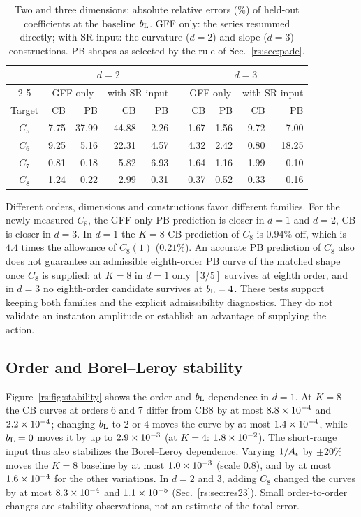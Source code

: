 \begin{table}[htbp]\centering\small
\begin{tabular}{@{}c rrrr c rrrr@{}}
\toprule
& \multicolumn{4}{c}{$d=2$} && \multicolumn{4}{c}{$d=3$}\\
\cmidrule{2-5}\cmidrule{7-10}
& \multicolumn{2}{c}{GFF only} & \multicolumn{2}{c}{with SR input} && \multicolumn{2}{c}{GFF only} & \multicolumn{2}{c}{with SR input}\\
Target & CB & PB & CB & PB && CB & PB & CB & PB\\ \midrule
$C_5$ & 7.75 & 37.99 & 44.88 & 2.26 && 1.67 & 1.56 & 9.72 & 7.00\\
$C_6$ & 9.25 & 5.16 & 22.31 & 4.57 && 4.32 & 2.42 & 0.80 & 18.25\\
$C_7$ & 0.81 & 0.18 & 5.82 & 6.93 && 1.64 & 1.16 & 1.99 & 0.10\\
$C_8$ & 1.24 & 0.22 & 2.99 & 0.31 && 0.37 & 0.52 & 0.33 & 0.16\\
\bottomrule
\end{tabular}
\caption{Two and three dimensions: absolute relative errors (\%) of held-out coefficients
at the baseline $b_{\mathrm L}$. GFF only: the series resummed directly; with SR input: the curvature
($d=2$) and slope ($d=3$) constructions. PB shapes as selected by the rule of
Sec.~\ref{rs:sec:pade}.}
\label{rs:tab:heldout23}
\end{table}

Different orders, dimensions and constructions favor different families. For the
newly measured $C_8$, the GFF-only PB prediction is closer in $d=1$ and $d=2$, CB is
closer in $d=3$. In $d=1$ the $K=8$ CB prediction of $C_8$ is $0.94\%$ off, which is $4.4$
times the allowance of $C_8(1)$ ($0.21\%$). An accurate PB prediction of $C_8$ also does not
guarantee an admissible eighth-order PB curve of the matched shape once $C_8$ is supplied: at
$K=8$ in $d=1$ only $[3/5]$ survives at eighth order, and in $d=3$ no eighth-order candidate
survives at $b_{\mathrm L}=4$. These tests support keeping both families and the
explicit admissibility diagnostics. They do not validate an instanton amplitude or establish
an advantage of supplying the action.

\subsection{Order and Borel--Leroy stability}
Figure~\ref{rs:fig:stability} shows the order and $b_{\mathrm L}$ dependence in $d=1$. At $K=8$ the CB
curves at orders 6 and 7 differ from CB8 by at most $8.8\times10^{-4}$ and $2.2\times10^{-4}$; changing
$b_{\mathrm L}$ to $2$ or $4$ moves the curve by at most $1.4\times10^{-4}$, while $b_{\mathrm L}=0$ moves it by up to
$2.9\times10^{-3}$ (at $K=4$: $1.8\times10^{-2}$). The short-range input thus also stabilizes the
Borel--Leroy dependence. Varying $1/A_\epsilon$ by $\pm20\%$ moves the $K=8$ baseline by at most
$1.0\times10^{-3}$ (scale $0.8$), and by at most $1.6\times10^{-4}$ for the other variations. In
$d=2$ and $3$, adding $C_8$ changed the curves by at most $8.3\times10^{-4}$ and $1.1\times10^{-5}$
(Sec.~\ref{rs:sec:res23}). Small order-to-order changes are stability observations, not an
estimate of the total error.

